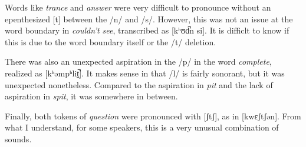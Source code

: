 \documentclass{article}
\newcommand{\lexi}[1]{\textit{#1}}
\begin{document}
\begin{enumerate}
    Words like \lexi{trance} and \lexi{answer} were very difficult to pronounce without an epenthesized [t] between the /n/ and /s/. However, this was not an issue at the word boundary in \lexi{couldn't see}, transcribed as [kʰʊd̚n si]. It is difficlt to know if this is due to the word boundary itself or the /t/ deletion.

    There was also an unexpected aspiration in the /p/ in the word \lexi{complete}, realized as [kʰəmpʰlit̠̚]. It makes sense in that /l/ is fairly sonorant, but it was unexpected nonetheless. Compared to the aspiration in \lexi{pit} and the lack of aspiration in \lexi{spit}, it was somewhere in between.

    Finally, both tokens of \lexi{question} were pronounced with [ʃtʃ], as in [kwɛʃtʃən]. From what I understand, for some speakers, this is a very unusual combination of sounds.
  \end{enumerate}
\end{document}
